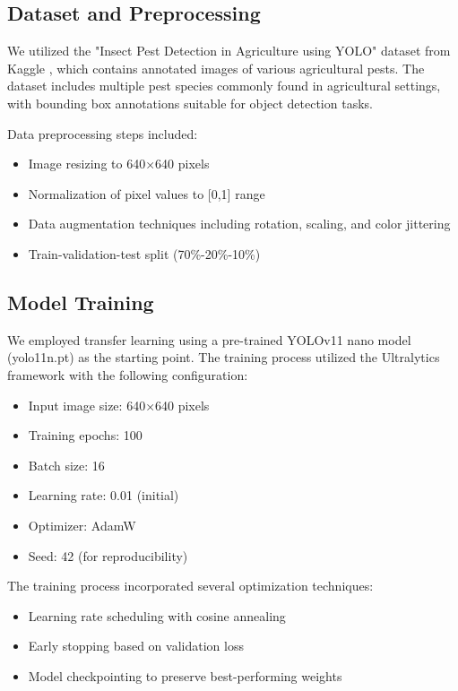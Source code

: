 \documentclass[conference]{IEEEtran}
\begin{document}
\subsection{Dataset and Preprocessing}

We utilized the "Insect Pest Detection in Agriculture using YOLO" dataset from Kaggle \cite{dataset}, which contains annotated images of various agricultural pests. The dataset includes multiple pest species commonly found in agricultural settings, with bounding box annotations suitable for object detection tasks.

Data preprocessing steps included:
\begin{itemize}
\item Image resizing to 640×640 pixels
\item Normalization of pixel values to [0,1] range
\item Data augmentation techniques including rotation, scaling, and color jittering
\item Train-validation-test split (70\%-20\%-10\%)
\end{itemize}

\subsection{Model Training}

We employed transfer learning using a pre-trained YOLOv11 nano model (yolo11n.pt) as the starting point. The training process utilized the Ultralytics framework with the following configuration:

\begin{itemize}
\item Input image size: 640×640 pixels
\item Training epochs: 100
\item Batch size: 16
\item Learning rate: 0.01 (initial)
\item Optimizer: AdamW
\item Seed: 42 (for reproducibility)
\end{itemize}

The training process incorporated several optimization techniques:
\begin{itemize}
\item Learning rate scheduling with cosine annealing
\item Early stopping based on validation loss
\item Model checkpointing to preserve best-performing weights
\end{itemize}
\end{document}
